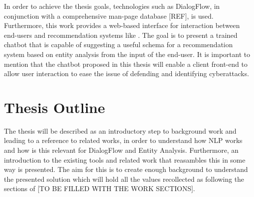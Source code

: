 In order to achieve the thesis goals, technologies such as DialogFlow, in conjunction with a comprehensive man-page database [REF], is used. Furthermore, this work provides a web-based interface for interaction between end-users and recommendation systems like \cite{MENTOR}. The goal is to present a trained chatbot that is capable of suggesting a useful schema for a recommendation system based on entity analysis from the input of the end-user. It is important to mention that the chatbot proposed in this thesis will enable a client front-end to allow user interaction to ease the issue of defending and identifying cyberattacks.


\section{Thesis Outline}
The thesis will be described as an introductory step to background work and leading to a reference to related works, in order to understand how NLP works and how is this relevant for DialogFlow and Entity Analysis. Furthermore, an introduction to the existing tools and related work that reasambles this in some way is presented. The aim for this is to create enough background to understand the presented solution which will hold all the values recollected as following the sections of [TO BE FILLED WITH THE WORK SECTIONS].

